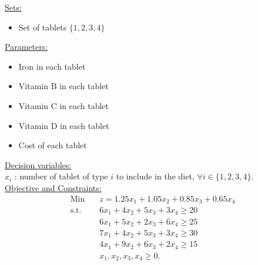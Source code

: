     \begin{solution}
    \smallskip \underline{Sets:}
    \begin{itemize}
    \item Set of tablets $\{1,2,3,4\}$
    \end{itemize}
    
    \smallskip \underline{Parameters:}
    \begin{itemize}
    \item Iron in each tablet
    \item Vitamin B in each tablet
    \item Vitamin C in each tablet
    \item Vitamin D in each tablet
    \item Cost of each tablet
    \end{itemize}
    
    \smallskip  \underline{Decision variables:} \\
    $x_i$ : number of tablet of type $i$ to include in the diet, $\forall i \in \{1,2,3,4\}$.\\
    
    \smallskip  \underline{Objective and Constraints:}
    \begin{align*}
    \mbox{Min~~ } & z = 1.25x_1 + 1.05x_2 + 0.85x_3 + 0.65x_4 \\
    \mbox{s.t.~~} &  6x_1 + 4x_2 + 5x_3 + 3x_4 \ge 20  \\
    & 6x_1 + 5x_2 + 2x_3 + 6x_4 \ge 25 \\
    & 7x_1 + 4x_2 + 5x_3 + 3x_4 \ge 30 \\
    & 4x_1 + 9x_2 + 6x_3 + 2x_4 \ge 15  \\
    & x_1, x_2, x_3, x_4 \ge 0. 
    \end{align*}
    \end{solution}
    
